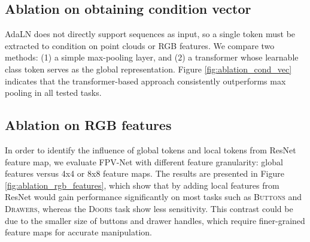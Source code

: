 


\subsection{Ablation on obtaining condition vector}


AdaLN does not directly support sequences as input, so a single token must be extracted to condition on point clouds or RGB features. We compare two methods: (1) a simple max-pooling layer, and (2) a transformer whose learnable class token serves as the global representation. Figure \ref{fig:ablation_cond_vec} indicates that the transformer-based approach consistently outperforms max pooling in all tested tasks.


\subsection{Ablation on RGB features}
In order to identify the influence of global tokens and local tokens from ResNet feature map, we evaluate FPV-Net with different feature granularity: global features versus 4x4 or 8x8 feature maps. The results are presented in Figure \ref{fig:ablation_rgb_features}, which show that by adding local features from ResNet would gain performance significantly on most tasks such as \textsc{Buttons} and \textsc{Drawers}, whereas the \textsc{Doors} task show less sensitivity. This contrast could be due to the smaller size of buttons and drawer handles, which require finer-grained feature maps for accurate manipulation.



